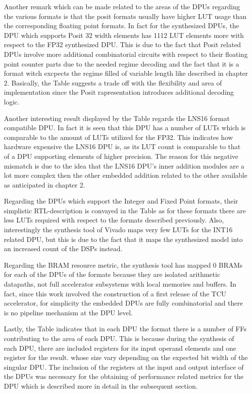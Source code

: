 Another remark which can be made related to the areas of the DPUs regarding the various formats is that the posit formats usually have higher LUT usage than the corresponding floating point formats. In fact for the synthesized DPUs, the DPU which supports Posit 32 width elements has 1112 LUT elements more with respect to the FP32 synthesized DPU. This is due to the fact that Posit related DPUs involve more additional combinatorial circuits with respect to their floating point counter parts due to the needed regime decoding and the fact that it is a format witch excpects the regime filled of variable length like described in chapter 2. Basically, the Table suggests a trade off with the flexibility and area of implementation since the Posit rapresentation introduces additional decoding logic. 

Another interesting result displayed by the Table regards the LNS16 format compatible DPU. In fact it is seen that this DPU has a number of LUTs which is comparable to the amount of LUTs utilized for the FP32. This indicates how hardware expensive the LNS16 DPU is, as its LUT count is comparable to that of a DPU supporting elements of higher precision. The reason for this negative mismatch is due to the idea that the LNS16 DPU's inner addition modules are a lot more complex then the other embedded addition related to the other available as anticipated in chapter 2.

Regarding the DPUs which support the Integer and Fixed Point formats, their simplistic RTL-description is convayed in the Table as for these formats there are less LUTs required with respect to the formats described previously. Also, interestingly the synthesis tool of Vivado maps very few LUTs for the INT16 related DPU, but this is due to the fact that it maps the synthesized model into an increased count of the DSPs instead.

Regarding the BRAM resource metric, the synthesis tool has mapped 0 BRAMs for each of the DPUs of the formats because they are isolated arithmetic datapaths, not full accelerator subsystems with local memories and buffers. In fact, since this work involved the construction of a first release of the TCU accelerator, for simplicity the embedded DPUs are fully combinatorial and there is no pipeline mechanism at the DPU level.

Lastly, the Table indicates that in each DPU the format there is a number of FFs contributing to the area of each DPU. This is because during the synthesis of each DPU, there are included registers for its input operand elements and one register for the result. whose size vary depending on the expected bit width of the singular DPU. The inclusion of the registers at the input and output interface of the DPUs was necessary for the obtaining of performance related metrics for the DPU which is described more in detail in the subsequent section.


